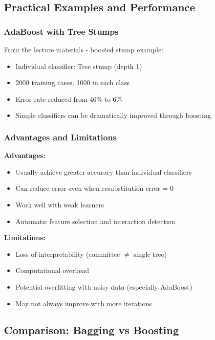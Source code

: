 \documentclass[12pt,a4paper]{article}
\begin{document}
\subsection{Practical Examples and Performance}

\subsubsection{AdaBoost with Tree Stumps}

From the lecture materials - boosted stump example:
\begin{itemize}
    \item Individual classifier: Tree stump (depth 1)
    \item 2000 training cases, 1000 in each class
    \item Error rate reduced from 46\% to 6\%
    \item Simple classifiers can be dramatically improved through boosting
\end{itemize}

\subsubsection{Advantages and Limitations}

\textbf{Advantages:}
\begin{itemize}
    \item Usually achieve greater accuracy than individual classifiers
    \item Can reduce error even when resubstitution error = 0
    \item Work well with weak learners
    \item Automatic feature selection and interaction detection
\end{itemize}

\textbf{Limitations:}
\begin{itemize}
    \item Loss of interpretability (committee $\ne$ single tree)
    \item Computational overhead
    \item Potential overfitting with noisy data (especially AdaBoost)
    \item May not always improve with more iterations
\end{itemize}

\subsection{Comparison: Bagging vs Boosting}
\end{document}
